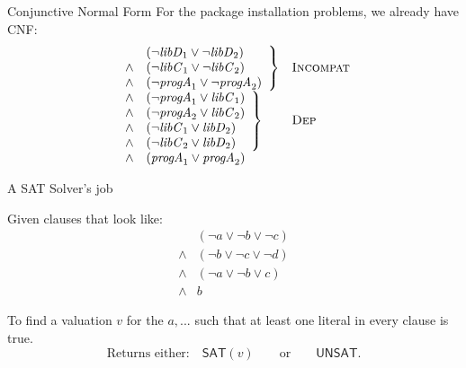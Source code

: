 \documentclass[xetex,aspectratio=169,14pt,hyperref={pdfpagelabels=true,pdflang={en-GB}}]{beamer}
\begin{document}
\begin{frame}
  {Conjunctive Normal Form}
  For the package installation problems, we already have CNF:
  \begin{displaymath}
    \begin{array}{ll}
      \left.
      \begin{array}{cl}
        &(\lnot \mathit{libD}_1 \lor \lnot \mathit{libD}_2) \\
        \land&(\lnot \mathit{libC}_1 \lor \lnot \mathit{libC}_2) \\
        \land&(\lnot \mathit{progA}_1 \lor \lnot \mathit{progA}_2)
      \end{array}
      \right\}
      &
        \textsc{Incompat}
      \\
      \left.
      \begin{array}{cl}
        \land&(\lnot \mathit{progA}_1 \lor \mathit{libC}_1) \\
        \land&(\lnot \mathit{progA}_2 \lor \mathit{libC}_2) \\
        \land&(\lnot \mathit{libC}_1 \lor \mathit{libD}_2) \\
        \land&(\lnot \mathit{libC}_2 \lor \mathit{libD}_2)
      \end{array}
               \right\} & \textsc{Dep}
      \\
      \left.\begin{array}{cl}
        \land &(\mathit{progA}_1 \lor \mathit{progA}_2)
      \end{array}\right.
    \end{array}
  \end{displaymath}

\end{frame}

\begin{frame}
  {A SAT Solver's job}

  Given clauses that look like:
  \begin{displaymath}
    \begin{array}{cl}
      &(\lnot a \lor \lnot b \lor \lnot c) \\
      \land&(\lnot b \lor \lnot c \lor \lnot d) \\
      \land&(\lnot a \lor \lnot b \lor c) \\
      \land&b
    \end{array}
  \end{displaymath}

  To find a valuation $v$ for the $a, ...$ such that at least one
  literal in every clause is true.
  \begin{displaymath}
    \textrm{Returns either:} \quad \mathsf{SAT}(v) \qquad \textrm{or} \qquad \mathsf{UNSAT}.
  \end{displaymath}
\end{frame}
\end{document}
